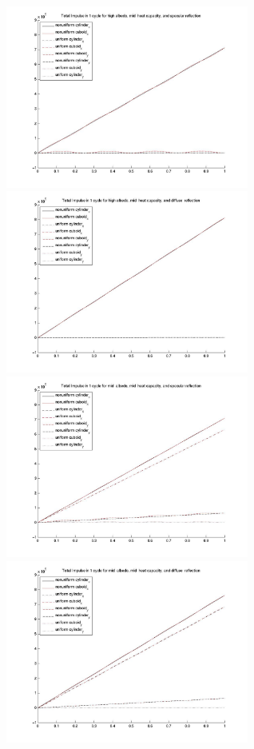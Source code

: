 \begin{description}
     \begin{figure}[!ht]
     \includegraphics[width=80mm]{figs/Plate_mod/I_alb_high_HC_mid__ref_spc.jpg}
     \includegraphics[width=80mm]{figs/Plate_mod/I_alb_high_HC_mid__ref_dif.jpg}
     \includegraphics[width=80mm]{figs/Plate_mod/I_alb_mid__HC_mid__ref_spc.jpg}
     \includegraphics[width=80mm]{figs/Plate_mod/I_alb_mid__HC_mid__ref_dif.jpg}

\end{figure}
\end{description}
